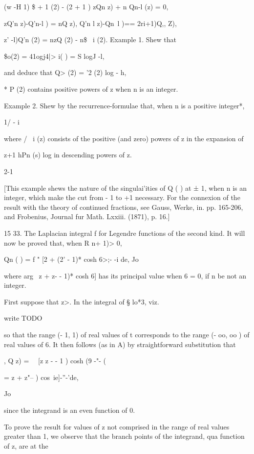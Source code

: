 {{(w -H 1) \$ + 1 (2) - (2 + 1 ) zQn z) + n Qn-l (z) = 0,

zQ'n z)-Q'n-l ) = nQ z), Q'n l z)-Qn~l )== 2ri+1)Q,, Z),

 z' -l)Q'n (2) = nzQ (2) - n\$ \ i (2). Example 1. Shew that

\$o(2) = 41ogj4|> i( ) = S logJ -l,

and deduce that Q> (2) = '2 (2) log - h,

* P (2) contains positive powers of z when n is an integer.

%
%

Example 2. Shew by the recurrence-formulae that, when n is a positive
integer*,

 1/ - i

where / \ i (z) consists of the positive (and zero) powers of z in the
expansion of

z+1 hPn (s) log in descending powers of z.

2-1

[This example shews the nature of the singulai'ities of Q ( ) at ± 1,
when n is an integer, which make the cut from - 1 to +1 necessary. For
the connexion of the result with the theory of continued fractions,
see Gauss, Werke, in. pp. 165-206, and Frobenius, Journal fur Math.
Lxxiii. (1871), p. 16.]

15 33. The Laplacian integral f for Legendre functions of the second
kind. It will now be proved that, when R n+ 1)> 0,

Qn ( ) = f " [2 + (2' - 1)* cosh 6>;- -i de, Jo

where arg \ z + z- - 1)* cosh 6] has its principal value when 6 = 0,
if n be not an integer.

First suppose that z>. In the integral of § lo*3, viz.

write TODO

so that the range (- 1, 1) of real values of t corresponds to the
range (- oo, oo ) of real values of 6. It then follows (as in
A) by straightforward substitution that

, Q z) = \ \ [z z - - 1 ) cosh (9 -"- (

= z + z"-- ) cos\ ie]-''-'de,

Jo

since the integrand is an even function of 0.

To prove the result for values of z not comprised in the range of real
values greater than 1, we observe that the branch points of the
integrand, qua function of z, are at the

}}
